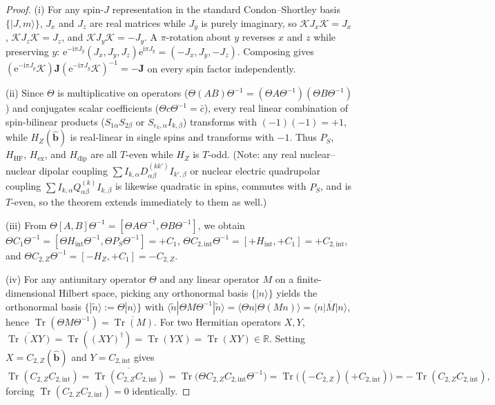 \documentclass[onecolumn,10pt,notitlepage,amsmath,amssymb,floatfix]{revtex4-2}
\theoremstyle{plain}
\theoremstyle{definition}
\newcommand{\ii}{\mathrm{i}}
\newcommand{\ee}{\mathrm{e}}
\newcommand{\Tr}{\operatorname{Tr}}
\newcommand{\PS}{P_S}
\newcommand{\HZ}{H_Z}
\newcommand{\HHF}{H_{\mathrm{HF}}}
\newcommand{\Hex}{H_{\mathrm{ex}}}
\newcommand{\Hdip}{H_{\mathrm{dip}}}
\newcommand{\Hint}{H_{\mathrm{int}}}
\begin{document}
\begin{proof}
(i) For any spin-$J$ representation in the standard Condon--Shortley basis $\{|J,m\rangle\}$, $J_x$ and $J_z$ are real matrices while $J_y$ is purely imaginary, so $\mathcal{K} J_x \mathcal{K} = J_x$, $\mathcal{K} J_z \mathcal{K} = J_z$, and $\mathcal{K} J_y \mathcal{K} = -J_y$. A $\pi$-rotation about $y$ reverses $x$ and $z$ while preserving $y$: $\ee^{-\ii\pi J_y}(J_x, J_y, J_z)\ee^{\ii\pi J_y} = (-J_x, J_y, -J_z)$. Composing gives $(\ee^{-\ii\pi J_y}\mathcal{K})\mathbf{J}(\ee^{-\ii\pi J_y}\mathcal{K})^{-1} = -\mathbf{J}$ on every spin factor independently.

(ii) Since $\Theta$ is multiplicative on operators ($\Theta(AB)\Theta^{-1} = (\Theta A\Theta^{-1})(\Theta B\Theta^{-1})$) and conjugates scalar coefficients ($\Theta c\Theta^{-1} = \bar{c}$), every real linear combination of spin-bilinear products ($S_{1\alpha}S_{2\beta}$ or $S_{e_k,\alpha}I_{k,\beta}$) transforms with $(-1)(-1) = +1$, while $\HZ(\hat{\mathbf{b}})$ is real-linear in single spins and transforms with $-1$. Thus $\PS$, $\HHF$, $\Hex$, and $\Hdip$ are all $T$-even while $\HZ$ is $T$-odd. (Note: any real nuclear--nuclear dipolar coupling $\sum I_{k,\alpha} D^{(kk')}_{\alpha\beta} I_{k',\beta}$ or nuclear electric quadrupolar coupling $\sum I_{k,\alpha} Q^{(k)}_{\alpha\beta} I_{k,\beta}$ is likewise quadratic in spins, commutes with $\PS$, and is $T$-even, so the theorem extends immediately to them as well.)

(iii) From $\Theta[A,B]\Theta^{-1} = [\Theta A\Theta^{-1}, \Theta B\Theta^{-1}]$, we obtain $\Theta C_1 \Theta^{-1} = [\Theta\Hint\Theta^{-1}, \Theta\PS\Theta^{-1}] = +C_1$, $\Theta C_{2,\mathrm{int}} \Theta^{-1} = [+\Hint, +C_1] = +C_{2,\mathrm{int}}$, and $\Theta C_{2,Z}\Theta^{-1} = [-\HZ, +C_1] = -C_{2,Z}$.

(iv) For any antiunitary operator $\Theta$ and any linear operator $M$ on a finite-dimensional Hilbert space, picking any orthonormal basis $\{|n\rangle\}$ yields the orthonormal basis $\{|\tilde{n}\rangle := \Theta|n\rangle\}$ with $\langle \tilde{n} | \Theta M \Theta^{-1} | \tilde{n} \rangle = \langle \Theta n | \Theta(M n) \rangle = \overline{\langle n | M | n \rangle}$, hence $\Tr(\Theta M \Theta^{-1}) = \overline{\Tr(M)}$. For two Hermitian operators $X, Y$, $\overline{\Tr(XY)} = \Tr((XY)^\dagger) = \Tr(YX) = \Tr(XY) \in \mathbb{R}$. Setting $X = C_{2,Z}(\hat{\mathbf{b}})$ and $Y = C_{2,\mathrm{int}}$ gives
\[
\Tr(C_{2,Z} C_{2,\mathrm{int}})
= \overline{\Tr(C_{2,Z} C_{2,\mathrm{int}})}
= \Tr\big(\Theta C_{2,Z} C_{2,\mathrm{int}} \Theta^{-1}\big)
= \Tr\big((-C_{2,Z})(+C_{2,\mathrm{int}})\big)
= -\Tr(C_{2,Z} C_{2,\mathrm{int}}),
\]
forcing $\Tr(C_{2,Z} C_{2,\mathrm{int}}) = 0$ identically.
\end{proof}
\end{document}
